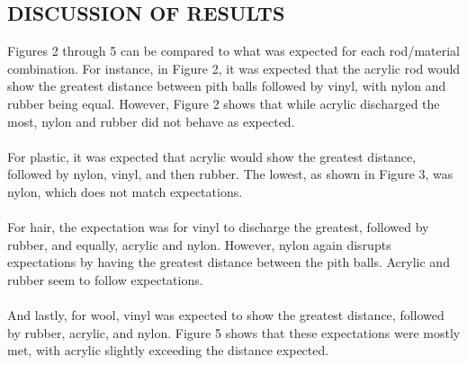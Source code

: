 \documentclass [12pt, letterpaper, twoside] {article}
\begin{document}
\begin {figure}
  \centering
  \caption {}
\end {figure}

\subsection* {DISCUSSION OF RESULTS}
Figures 2 through 5 can be compared to what was expected for each rod/material combination. For instance, in Figure 2, it was expected that the acrylic rod would show the greatest distance between pith balls followed by vinyl, with nylon and rubber being equal. However, Figure 2 shows that while acrylic discharged the most, nylon and rubber did not behave as expected. \\\\
For plastic, it was expected that acrylic would show the greatest distance, followed by nylon, vinyl, and then rubber. The lowest, as shown in Figure 3, was nylon, which does not match expectations. \\\\
For hair, the expectation was for vinyl to discharge the greatest, followed by rubber, and equally, acrylic and nylon. However, nylon again disrupts expectations by having the greatest distance between the pith balls. Acrylic and rubber seem to follow expectations. \\\\
And lastly, for wool, vinyl was expected to show the greatest distance, followed by rubber, acrylic, and nylon. Figure 5 shows that these expectations were mostly met, with acrylic slightly exceeding the distance expected. \\
\end{document}
